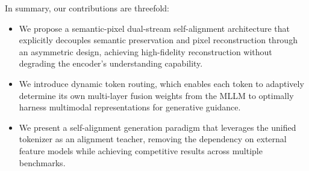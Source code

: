 \documentclass[runningheads]{llncs}
\begin{document}
In summary, our contributions are threefold:
\vspace{-5pt}
\begin{itemize}
    \item We propose a semantic-pixel dual-stream self-alignment architecture that explicitly decouples semantic preservation and pixel reconstruction through an asymmetric design, achieving high-fidelity reconstruction without degrading the encoder's understanding capability.
    \item We introduce dynamic token routing, which enables each token to adaptively determine its own multi-layer fusion weights from the MLLM to optimally harness multimodal representations for generative guidance.
    \item We present a self-alignment generation paradigm that leverages the unified tokenizer as an alignment teacher, removing the dependency on external feature models while achieving competitive results across multiple benchmarks.
\end{itemize}


\end{document}
